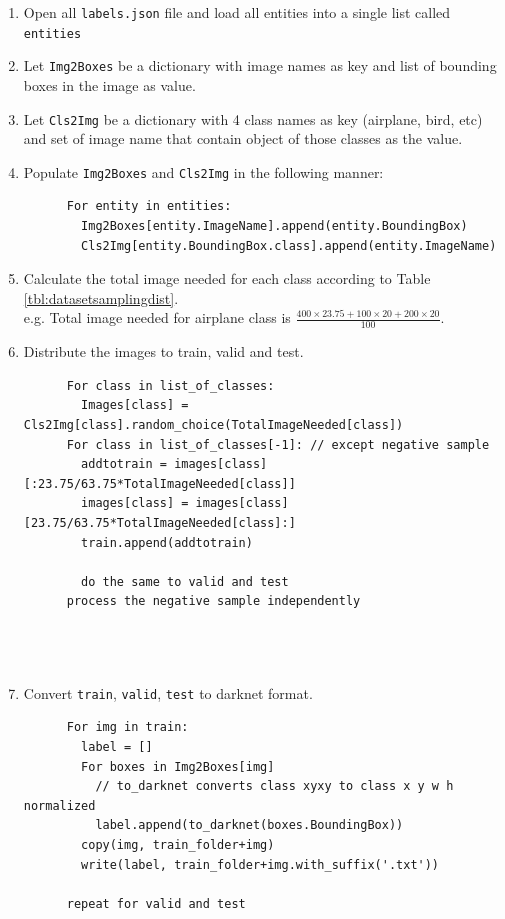     \begin{enumerate}
      \item Open all \verb|labels.json| file and load all entities into a single list called \verb*|entities|
      \item Let \verb|Img2Boxes| be a dictionary with image names as key and list of bounding boxes in the image as value.
      \item Let \verb|Cls2Img| be a dictionary with 4 class names as key (airplane, bird, etc) and set of image name that contain object of those classes as the value.
      \item Populate \verb|Img2Boxes| and \verb|Cls2Img| in the following manner:
      \begin{lstlisting}
      For entity in entities:
        Img2Boxes[entity.ImageName].append(entity.BoundingBox)
        Cls2Img[entity.BoundingBox.class].append(entity.ImageName)
      \end{lstlisting}
      \item Calculate the total image needed for each class according to Table \ref{tbl:datasetsamplingdist}.\\
            e.g. Total image needed for airplane class is $\frac{400\times 23.75+100\times 20+200\times 20}{100}$.
      \item Distribute the images to train, valid and test.
      \begin{lstlisting}
      For class in list_of_classes:
        Images[class] = Cls2Img[class].random_choice(TotalImageNeeded[class])
      For class in list_of_classes[-1]: // except negative sample
        addtotrain = images[class][:23.75/63.75*TotalImageNeeded[class]]
        images[class] = images[class][23.75/63.75*TotalImageNeeded[class]:]
        train.append(addtotrain)

        do the same to valid and test
      process the negative sample independently
        

      
      \end{lstlisting}
    
      \item Convert \verb|train|, \verb|valid|, \verb|test| to darknet format.
      \begin{lstlisting}
      For img in train:
        label = []
        For boxes in Img2Boxes[img]
          // to_darknet converts class xyxy to class x y w h normalized
          label.append(to_darknet(boxes.BoundingBox))
        copy(img, train_folder+img)
        write(label, train_folder+img.with_suffix('.txt'))

      repeat for valid and test
      \end{lstlisting}

    \end{enumerate}


